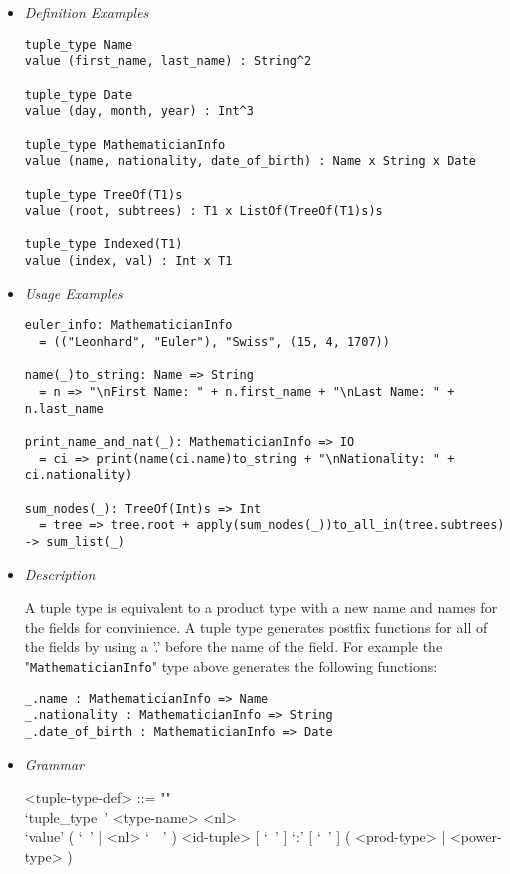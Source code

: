 \documentclass{article}
\begin{document}
\begin{itemize}
\item \textit{Definition Examples}

\begin{verbatim}
tuple_type Name
value (first_name, last_name) : String^2

tuple_type Date
value (day, month, year) : Int^3

tuple_type MathematicianInfo
value (name, nationality, date_of_birth) : Name x String x Date

tuple_type TreeOf(T1)s
value (root, subtrees) : T1 x ListOf(TreeOf(T1)s)s

tuple_type Indexed(T1)
value (index, val) : Int x T1
\end{verbatim}

\item \textit{Usage Examples}

\begin{verbatim}
euler_info: MathematicianInfo
  = (("Leonhard", "Euler"), "Swiss", (15, 4, 1707))

name(_)to_string: Name => String
  = n => "\nFirst Name: " + n.first_name + "\nLast Name: " + n.last_name

print_name_and_nat(_): MathematicianInfo => IO
  = ci => print(name(ci.name)to_string + "\nNationality: " + ci.nationality)

sum_nodes(_): TreeOf(Int)s => Int
  = tree => tree.root + apply(sum_nodes(_))to_all_in(tree.subtrees) -> sum_list(_)
\end{verbatim}

\item \textit{Description}

A tuple type is equivalent to a product type with a new name  and names for the
fields for convinience. A tuple type generates postfix functions for all of
the fields by using a '.' before the name of the field. For example the
"\verb|MathematicianInfo|" type above generates the following functions:
\begin{verbatim}
_.name : MathematicianInfo => Name
_.nationality : MathematicianInfo => String
_.date_of_birth : MathematicianInfo => Date
\end{verbatim}

\newpage

\item \textit{Grammar}

\begin{grammar}
<tuple-type-def> ::= ""\\
`tuple_type\ ' <type-name> <nl> \\
`value' ( `\ ' | <nl> `\ \ ' )
<id-tuple> [ `\ ' ] `:' [ `\ ' ] ( <prod-type> | <power-type> )


\end{grammar}
\end{itemize}
\end{document}
